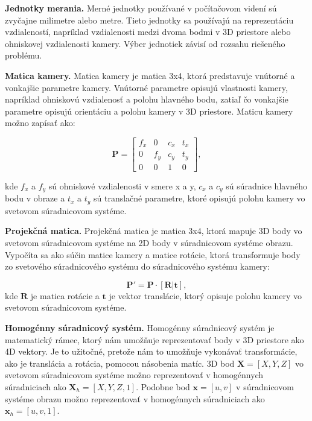 {\textbf{Jednotky merania.} Merné jednotky používané v počítačovom videní sú zvyčajne milimetre alebo metre. Tieto jednotky sa používajú na reprezentáciu vzdialeností, napríklad vzdialenosti medzi dvoma bodmi v 3D priestore alebo ohniskovej vzdialenosti kamery. Výber jednotiek závisí od rozsahu riešeného problému.

\textbf{Matica kamery.} Matica kamery je matica 3x4, ktorá predstavuje vnútorné a vonkajšie parametre kamery. Vnútorné parametre opisujú vlastnosti kamery, napríklad ohniskovú vzdialenosť a polohu hlavného bodu, zatiaľ čo vonkajšie parametre opisujú orientáciu a polohu kamery v 3D priestore. Maticu kamery možno zapísať ako:

\begin{equation}
\mathbf{P} = \begin{bmatrix}f_x & 0 & c_x & t_x \\ 0 & f_y & c_y & t_y \\ 0 & 0 & 1 & 0\end{bmatrix},
\end{equation}

kde $f_x$ a $f_y$ sú ohniskové vzdialenosti v smere x a y, $c_x$ a $c_y$ sú súradnice hlavného bodu v obraze a $t_x$ a $t_y$ sú translačné parametre, ktoré opisujú polohu kamery vo svetovom súradnicovom systéme.

\textbf{Projekčná matica.} Projekčná matica je matica 3x4, ktorá mapuje 3D body vo svetovom súradnicovom systéme na 2D body v súradnicovom systéme obrazu. Vypočíta sa ako súčin matice kamery a matice rotácie, ktorá transformuje body zo svetového súradnicového systému do súradnicového systému kamery:

\begin{equation}
\mathbf{P'} = \mathbf{P} \cdot [\mathbf{R} | \mathbf{t}],
\end{equation}
kde $\mathbf{R}$ je matica rotácie a $\mathbf{t}$ je vektor translácie, ktorý opisuje polohu kamery vo svetovom súradnicovom systéme.

\textbf{Homogénny súradnicový systém.} Homogénny súradnicový systém je matematický rámec, ktorý nám umožňuje reprezentovať body v 3D priestore ako 4D vektory. Je to užitočné, pretože nám to umožňuje vykonávať transformácie, ako je translácia a rotácia, pomocou násobenia matíc. 3D bod $\mathbf{X} = [X, Y, Z]$ vo svetovom súradnicovom systéme možno reprezentovať v homogénnych súradniciach ako $\mathbf{X}_h = [X, Y, Z, 1]$. Podobne bod $\mathbf{x} = [u, v]$ v súradnicovom systéme obrazu možno reprezentovať v homogénnych súradniciach ako $\mathbf{x}_h = [u, v, 1]$.

}
